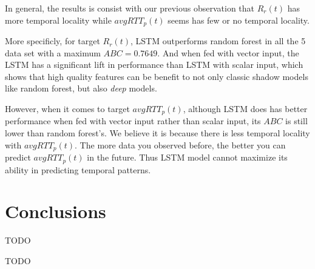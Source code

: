 \documentclass[sigconf]{acmart}
\begin{document}
	In general, the results is consist with our previous observation that $R_r(t)$ has more temporal locality while $avgRTT_p(t)$ seems has few or no temporal locality.
	
	More specificly, for target $R_r(t)$, LSTM outperforms random forest in all the 5 data set with a maximum $ABC=0.7649$. And when fed with vector input, the LSTM has a significant lift in performance than LSTM with scalar input, which shows that high quality features can be benefit to not only classic shadow models like random forest, but also \textit{deep} models.
	
	However, when it comes to target $avgRTT_p(t)$, although LSTM does has better performance when fed with vector input rather than scalar input, its $ABC$ is still lower than random forest's. We believe it is because there is less temporal locality with $avgRTT_p(t)$. The more data you observed before, the better you can predict $avgRTT_p(t)$ in the future. Thus LSTM model cannot maximize its ability in predicting temporal patterns.
	\section{Conclusions}
	TODO
	
	\begin{acks}
		TODO
	\end{acks}
	
	
	
	
	 
	
\end{document}
